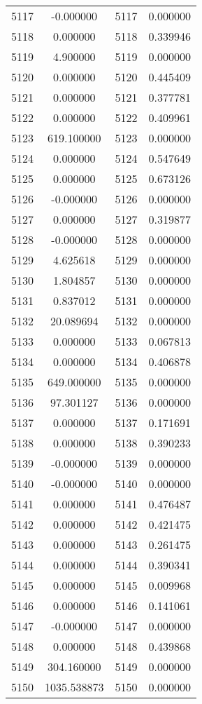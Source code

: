 \documentclass[12pt]{article}
\begin{document}
\begin{longtable}{@{}cccc@{}}
5117 & -0.000000 & 5117 & 0.000000 \\
5118 & 0.000000 & 5118 & 0.339946 \\
5119 & 4.900000 & 5119 & 0.000000 \\
5120 & 0.000000 & 5120 & 0.445409 \\
5121 & 0.000000 & 5121 & 0.377781 \\
5122 & 0.000000 & 5122 & 0.409961 \\
5123 & 619.100000 & 5123 & 0.000000 \\
5124 & 0.000000 & 5124 & 0.547649 \\
5125 & 0.000000 & 5125 & 0.673126 \\
5126 & -0.000000 & 5126 & 0.000000 \\
5127 & 0.000000 & 5127 & 0.319877 \\
5128 & -0.000000 & 5128 & 0.000000 \\
5129 & 4.625618 & 5129 & 0.000000 \\
5130 & 1.804857 & 5130 & 0.000000 \\
5131 & 0.837012 & 5131 & 0.000000 \\
5132 & 20.089694 & 5132 & 0.000000 \\
5133 & 0.000000 & 5133 & 0.067813 \\
5134 & 0.000000 & 5134 & 0.406878 \\
5135 & 649.000000 & 5135 & 0.000000 \\
5136 & 97.301127 & 5136 & 0.000000 \\
5137 & 0.000000 & 5137 & 0.171691 \\
5138 & 0.000000 & 5138 & 0.390233 \\
5139 & -0.000000 & 5139 & 0.000000 \\
5140 & -0.000000 & 5140 & 0.000000 \\
5141 & 0.000000 & 5141 & 0.476487 \\
5142 & 0.000000 & 5142 & 0.421475 \\
5143 & 0.000000 & 5143 & 0.261475 \\
5144 & 0.000000 & 5144 & 0.390341 \\
5145 & 0.000000 & 5145 & 0.009968 \\
5146 & 0.000000 & 5146 & 0.141061 \\
5147 & -0.000000 & 5147 & 0.000000 \\
5148 & 0.000000 & 5148 & 0.439868 \\
5149 & 304.160000 & 5149 & 0.000000 \\
5150 & 1035.538873 & 5150 & 0.000000 \\

\end{longtable}
\end{document}
